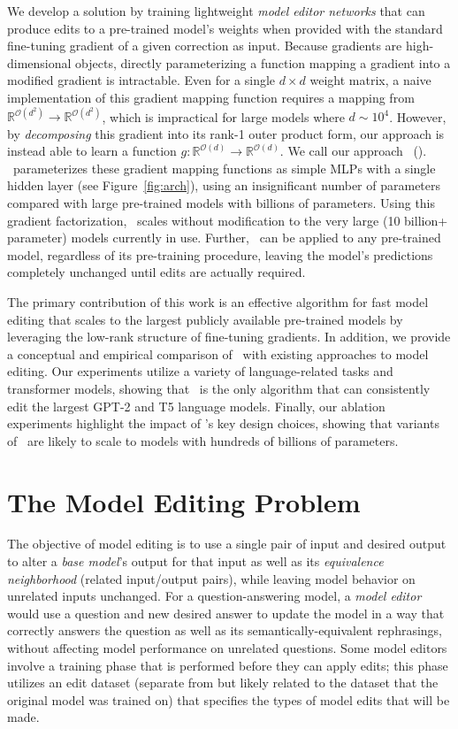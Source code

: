 \documentclass{article}
\begin{document}
We develop a solution by training lightweight \textit{model editor networks} that can produce edits to a pre-trained model's weights when provided with the standard fine-tuning gradient of a given correction as input. Because gradients are high-dimensional objects, directly parameterizing a function mapping a gradient into a modified gradient is intractable. Even for a single $d \times d$ weight matrix, a naive implementation of this gradient mapping function requires a mapping from $\mathbb{R}^{\mathcal{O}(d^2)} \rightarrow \mathbb{R}^{\mathcal{O}(d^2)}$, which is impractical for large models where $d\sim10^4$. However, by \textit{decomposing} this gradient into its rank-1 outer product form, our approach is instead able to learn a function $g:\mathbb{R}^{\mathcal{O}(d)} \rightarrow \mathbb{R}^{\mathcal{O}(d)}$. We call our approach \fullname~(\name). \name~parameterizes these gradient mapping functions as simple MLPs with a single hidden layer (see Figure~\ref{fig:arch}), using an insignificant number of parameters compared with large pre-trained models with billions of parameters. Using this gradient factorization, \name~scales without modification to the very large (10 billion+ parameter) models currently in use. Further, \name~can be applied to any pre-trained model, regardless of its pre-training procedure, leaving the model's predictions completely unchanged until edits are actually required.

The primary contribution of this work is an effective algorithm for fast model editing that scales to the largest publicly available pre-trained models by leveraging the low-rank structure of fine-tuning gradients. In addition, we provide a conceptual and empirical comparison of \name~with existing approaches to model editing. Our experiments utilize a variety of language-related tasks and transformer models, showing that \name~is the only algorithm that can consistently edit the largest GPT-2 \citep{radford2019language} and T5 \citep{2020t5} language models. Finally, our ablation experiments highlight the impact of \name's key design choices, showing that variants of \name~are likely to scale to models with hundreds of billions of parameters.


\section{The Model Editing Problem}
The objective of model editing is to use a single pair of input and desired output to alter a \textit{base model}'s output for that input as well as its \textit{equivalence neighborhood} (related input/output pairs), while leaving model behavior on unrelated inputs unchanged. For a question-answering model, a \textit{model editor} would use a question and new desired answer to update the model in a way that correctly answers the question as well as its semantically-equivalent rephrasings, without affecting model performance on unrelated questions. Some model editors involve a training phase that is performed before they can apply edits; this phase utilizes an edit dataset (separate from but likely related to the dataset that the original model was trained on) that specifies the types of model edits that will be made.
\end{document}
